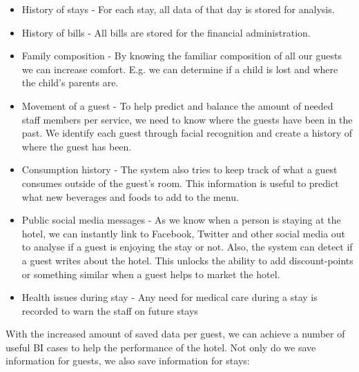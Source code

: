 \begin{itemize}
	\item History of stays - For each stay, all data of that day is stored for analysis.
	\item History of bills - All bills are stored for the financial administration.
	\item Family composition - By knowing the familiar composition of all our guests we can increase comfort. E.g. we can determine if a child is lost and where the child's parents are.
	\item Movement of a guest - To help predict and balance the amount of needed staff members per service, we need to know where the guests have been in the past. We identify each guest through facial recognition and create a history of where the guest has been.
	\item Consumption history - The system also tries to keep track of what a guest consumes outside of the guest's room. This information is useful to predict what new beverages and foods to add to the menu.
	\item Public social media messages - As we know when a person is staying at the hotel, we can instantly link to Facebook, Twitter and other social media out to analyse if a guest is enjoying the stay or not. Also, the system can detect if a guest writes about the hotel. This unlocks the ability to add discount-points or something similar when a guest helps to market the hotel.
	\item Health issues during stay - Any need for medical care during a stay is recorded to warn the staff on future stays
\end{itemize}

With the increased amount of saved data per guest, we can achieve a number of useful BI cases to help the performance of the hotel. Not only do we save information for guests, we also save information for stays:

